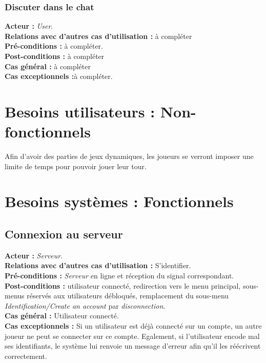 \documentclass[10pt, a4paper]{article}
\begin{document}
\subsubsection{Discuter dans le chat}
\textbf{Acteur :} \textit{User}.\\
\textbf{Relations avec d'autres cas d'utilisation :} à compléter\\
\textbf{Pré-conditions :} à compléter.\\
\textbf{Post-conditions :} à compléter\\
\textbf{Cas général :} à compléter\\
\textbf{Cas exceptionnels :}à compléter.

\section{Besoins utilisateurs : Non-fonctionnels}
Afin d'avoir des parties de jeux dynamiques, les joueurs se verront imposer une limite de temps pour pouvoir jouer leur tour. \\
		
\section{Besoins systèmes : Fonctionnels}

\subsection{Connexion au serveur}
\textbf{Acteur :} \textit{Serveur}. \\
\textbf{Relations avec d'autres cas d'utilisation :} S'identifier. \\
\textbf{Pré-conditions :} \textit{Serveur} en ligne et réception du signal correspondant. \\
\textbf{Post-conditions :} utilisateur connecté, redirection vers le menu principal, sous-menus réservés aux utilisateurs débloqués, remplacement du sous-menu \textit{Identification/Create an account} par \textit{disconnection}. \\
\textbf{Cas général :} Utilisateur connecté. \\
\textbf{Cas exceptionnels :} Si un utilisateur est déjà connecté sur un compte, un autre joueur ne peut se connecter sur ce compte. Egalement, si l’utilisateur encode mal ses identifiants, le système lui renvoie un message d’erreur afin qu’il les réécrivent correctement. \\
\end{document}
